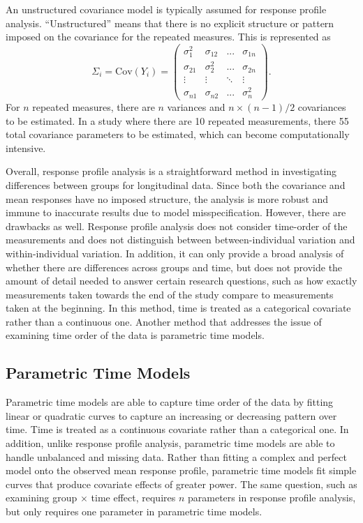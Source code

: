 \documentclass[12pt, twoside]{amherstthesis}
\begin{document}
An unstructured covariance model is typically assumed for response profile analysis. ``Unstructured'' means that there is no explicit structure or pattern imposed on the covariance for the repeated measures. This is represented as \[\Sigma_i=\text{Cov}(Y_i) = \begin{pmatrix} \sigma_1^2 &\sigma_{12} & ...& \sigma_{1n} \\ \sigma_{21} &\sigma_2^2 & ... & \sigma_{2n} \\ \vdots & \vdots & \ddots & \vdots \\ \sigma_{n1} & \sigma_{n2} & ... & \sigma_n^2\end{pmatrix}.\] For \(n\) repeated measures, there are \(n\) variances and \(n \times (n-1)/2\) covariances to be estimated. In a study where there are 10 repeated measurements, there 55 total covariance parameters to be estimated, which can become computationally intensive.

Overall, response profile analysis is a straightforward method in investigating differences between groups for longitudinal data. Since both the covariance and mean responses have no imposed structure, the analysis is more robust and immune to inaccurate results due to model misspecification. However, there are drawbacks as well. Response profile analysis does not consider time-order of the measurements and does not distinguish between between-individual variation and within-individual variation. In addition, it can only provide a broad analysis of whether there are differences across groups and time, but does not provide the amount of detail needed to answer certain research questions, such as how exactly measurements taken towards the end of the study compare to measurements taken at the beginning. In this method, time is treated as a categorical covariate rather than a continuous one. Another method that addresses the issue of examining time order of the data is parametric time models.

\hypertarget{parametric-time-models}{%
\subsection{Parametric Time Models}\label{parametric-time-models}}

Parametric time models are able to capture time order of the data by fitting linear or quadratic curves to capture an increasing or decreasing pattern over time. Time is treated as a continuous covariate rather than a categorical one. In addition, unlike response profile analysis, parametric time models are able to handle unbalanced and missing data. Rather than fitting a complex and perfect model onto the observed mean response profile, parametric time models fit simple curves that produce covariate effects of greater power. The same question, such as examining group \(\times\) time effect, requires \(n\) parameters in response profile analysis, but only requires one parameter in parametric time models.
\end{document}
